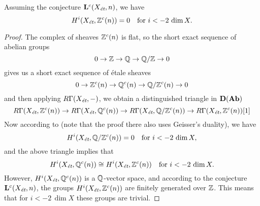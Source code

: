 \begin{lemma}
  \label{lemma:finite-generation-implies-boundedness}
  Assuming the conjecture $\mathbf{L}^c (X_\text{\it ét}, n)$, we have
  $$H^i (X_\text{\it ét}, \mathbb{Z}^c (n)) = 0\quad\text{for }i < -2\,\dim X.$$

  \begin{proof}
    The complex of sheaves $\mathbb{Z}^c (n)$ is flat, so the short exact sequence of
    abelian groups
    $$0 \to \mathbb{Z} \to \mathbb{Q} \to \mathbb{Q}/\mathbb{Z} \to 0$$
    gives us a short exact sequence of étale sheaves
    $$0 \to \mathbb{Z}^c (n) \to \mathbb{Q}^c (n) \to \mathbb{Q}/\mathbb{Z}^c (n) \to 0$$
    and then applying $R\Gamma (X_\text{\it ét}, -)$, we obtain a distinguished
    triangle in $\text{\bf D} (\text{\bf Ab})$
    \[ R\Gamma (X_\text{\it ét}, \mathbb{Z}^c (n)) \to
      R\Gamma (X_\text{\it ét}, \mathbb{Q}^c (n)) \to
      R\Gamma (X_\text{\it ét}, \mathbb{Q}/\mathbb{Z}^c (n)) \to
      R\Gamma (X_\text{\it ét}, \mathbb{Z}^c (n)) [1] \]
    Now according to \cite[Lemma 5.12]{Morin-14} (note that the proof there also
    uses Geisser's duality), we have
    \[ H^i (X_\text{\it ét}, \mathbb{Q}/\mathbb{Z}^c (n)) = 0
      \quad\text{for }i < -2\,\dim X, \]
    and the above triangle implies that
    \[ H^i (X_\text{\it ét}, \mathbb{Q}^c (n)) \cong
      H^i (X_\text{\it ét}, \mathbb{Z}^c (n))
      \quad\text{for }i < -2\,\dim X. \]
    However, $H^i (X_\text{\it ét}, \mathbb{Q}^c (n))$ is a $\mathbb{Q}$-vector space, and
    according to the conjecture $\mathbf{L}^c (X_\text{\it ét}, n)$, the groups
    $H^i (X_\text{\it ét}, \mathbb{Z}^c (n))$ are finitely generated over $\mathbb{Z}$.
    This means that for $i < -2\,\dim X$ these groups are trivial.
  \end{proof}
\end{lemma}

